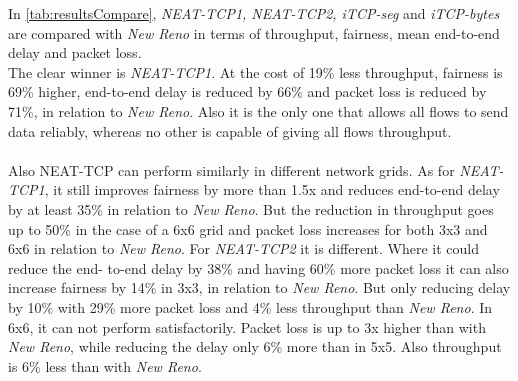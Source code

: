 In \autoref{tab:resultsCompare}, \textit{NEAT-TCP1, NEAT-TCP2, iTCP-seg} and \textit{iTCP-bytes} are compared with \textit{New Reno} in terms of throughput, fairness, mean end-to-end delay and packet loss. \\
The clear winner is \textit{NEAT-TCP1}. At the cost of 19\% less throughput, fairness is 69\% higher, end-to-end delay is reduced by 66\% and packet loss is reduced by 71\%, in relation to \textit{New Reno}. Also it is the only one that allows all flows to send data reliably, whereas no other is capable of giving all flows throughput.\\\\
Also NEAT-TCP can perform similarly in different network grids. As for \textit{NEAT-TCP1}, it still improves fairness by more than 1.5x and reduces end-to-end delay by at least 35\% in relation to \textit{New Reno}. But the reduction in throughput goes up to 50\% in the case of a 6x6 grid and packet loss increases for both 3x3 and 6x6 in relation to \textit{New Reno}.
For \textit{NEAT-TCP2} it is different. Where it could reduce the end- to-end delay by 38\% and having 60\% more packet loss it can also increase fairness by 14\% in 3x3, in relation to \textit{New Reno}. But only reducing delay by 10\% with 29\% more packet loss and 4\% less throughput than \textit{New Reno}. In 6x6, it can not perform satisfactorily. Packet loss is up to 3x higher than with \textit{New Reno}, while reducing the delay only 6\% more than in 5x5. Also throughput is 6\% less than with \textit{New Reno}.

